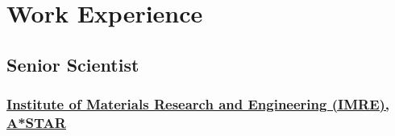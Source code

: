 \documentclass{my_cv}%
\begin{document}
\section{Work Experience}
\vspace{1.0em}
\subsection{Senior Scientist}
\subsubsection{\href{https://www.a-star.edu.sg/imre}{Institute of Materials Research and Engineering (IMRE), A*STAR}}
\hypersetup{
    colorlinks=true, %
    linkcolor=mypink, %
    urlcolor=blue,   %
    citecolor=black  %
}
\end{document}

